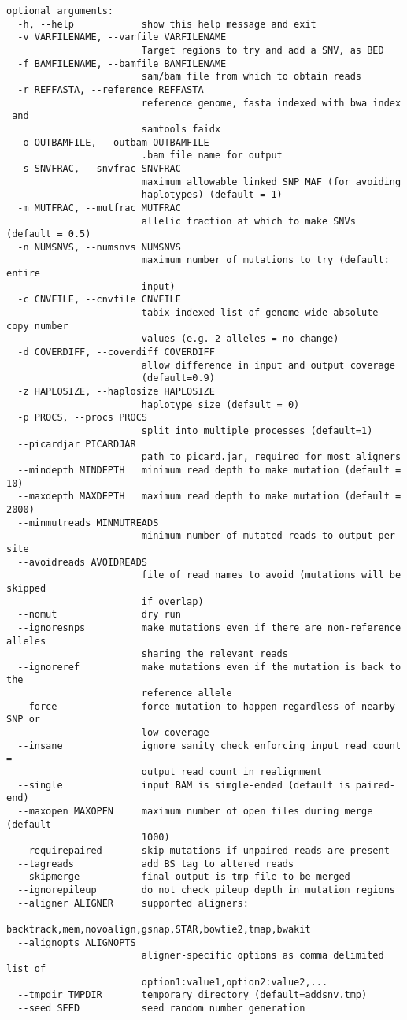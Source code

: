 \documentclass[letterpaper,11pt]{article}
\begin{document}
\begin{verbatim}
optional arguments:
  -h, --help            show this help message and exit
  -v VARFILENAME, --varfile VARFILENAME
                        Target regions to try and add a SNV, as BED
  -f BAMFILENAME, --bamfile BAMFILENAME
                        sam/bam file from which to obtain reads
  -r REFFASTA, --reference REFFASTA
                        reference genome, fasta indexed with bwa index _and_
                        samtools faidx
  -o OUTBAMFILE, --outbam OUTBAMFILE
                        .bam file name for output
  -s SNVFRAC, --snvfrac SNVFRAC
                        maximum allowable linked SNP MAF (for avoiding
                        haplotypes) (default = 1)
  -m MUTFRAC, --mutfrac MUTFRAC
                        allelic fraction at which to make SNVs (default = 0.5)
  -n NUMSNVS, --numsnvs NUMSNVS
                        maximum number of mutations to try (default: entire
                        input)
  -c CNVFILE, --cnvfile CNVFILE
                        tabix-indexed list of genome-wide absolute copy number
                        values (e.g. 2 alleles = no change)
  -d COVERDIFF, --coverdiff COVERDIFF
                        allow difference in input and output coverage
                        (default=0.9)
  -z HAPLOSIZE, --haplosize HAPLOSIZE
                        haplotype size (default = 0)
  -p PROCS, --procs PROCS
                        split into multiple processes (default=1)
  --picardjar PICARDJAR
                        path to picard.jar, required for most aligners
  --mindepth MINDEPTH   minimum read depth to make mutation (default = 10)
  --maxdepth MAXDEPTH   maximum read depth to make mutation (default = 2000)
  --minmutreads MINMUTREADS
                        minimum number of mutated reads to output per site
  --avoidreads AVOIDREADS
                        file of read names to avoid (mutations will be skipped
                        if overlap)
  --nomut               dry run
  --ignoresnps          make mutations even if there are non-reference alleles
                        sharing the relevant reads
  --ignoreref           make mutations even if the mutation is back to the
                        reference allele
  --force               force mutation to happen regardless of nearby SNP or
                        low coverage
  --insane              ignore sanity check enforcing input read count =
                        output read count in realignment
  --single              input BAM is simgle-ended (default is paired-end)
  --maxopen MAXOPEN     maximum number of open files during merge (default
                        1000)
  --requirepaired       skip mutations if unpaired reads are present
  --tagreads            add BS tag to altered reads
  --skipmerge           final output is tmp file to be merged
  --ignorepileup        do not check pileup depth in mutation regions
  --aligner ALIGNER     supported aligners:
                        backtrack,mem,novoalign,gsnap,STAR,bowtie2,tmap,bwakit
  --alignopts ALIGNOPTS
                        aligner-specific options as comma delimited list of
                        option1:value1,option2:value2,...
  --tmpdir TMPDIR       temporary directory (default=addsnv.tmp)
  --seed SEED           seed random number generation


\end{verbatim}
\end{document}
